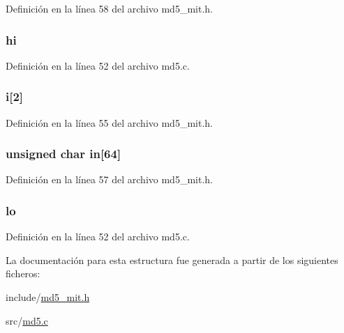 Definición en la línea 58 del archivo md5\+\_\+mit.\+h.

\hypertarget{struct_m_d5___c_t_x_ad674a11709e105451f48b99b9fe54792}{}
\subsubsection[{hi}]{ hi}\label{struct_m_d5___c_t_x_ad674a11709e105451f48b99b9fe54792}


Definición en la línea 52 del archivo md5.\+c.

\hypertarget{struct_m_d5___c_t_x_aa94c7f6cf6c16dd45ecbf7be4af32f0c}{}
\subsubsection[{i}]{ i\mbox{[}2\mbox{]}}\label{struct_m_d5___c_t_x_aa94c7f6cf6c16dd45ecbf7be4af32f0c}


Definición en la línea 55 del archivo md5\+\_\+mit.\+h.

\hypertarget{struct_m_d5___c_t_x_a3a40a33a5c6b34a5d53569057cbe8c4c}{}
\subsubsection[{in}]{\setlength{\rightskip}{0pt plus 5cm}unsigned char in\mbox{[}64\mbox{]}}\label{struct_m_d5___c_t_x_a3a40a33a5c6b34a5d53569057cbe8c4c}


Definición en la línea 57 del archivo md5\+\_\+mit.\+h.

\hypertarget{struct_m_d5___c_t_x_ab6f070d5d937f16cddb2d666c32fdb8e}{}
\subsubsection[{lo}]{ lo}\label{struct_m_d5___c_t_x_ab6f070d5d937f16cddb2d666c32fdb8e}


Definición en la línea 52 del archivo md5.\+c.



La documentación para esta estructura fue generada a partir de los siguientes ficheros\+:\begin{DoxyCompactItemize}
\item 
include/\hyperlink{md5__mit_8h}{md5\+\_\+mit.\+h}\item 
src/\hyperlink{md5_8c}{md5.\+c}\end{DoxyCompactItemize}
